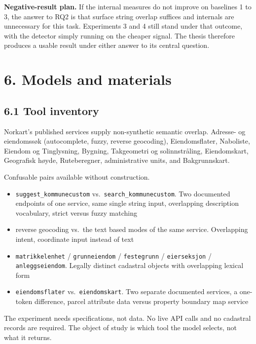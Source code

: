 \documentclass[11pt,a4paper]{article}
\begin{document}
\textbf{Negative-result plan.} If the internal measures do not improve on baselines 1 to 3, the answer
to RQ2 is that surface string overlap suffices and internals are unnecessary for this task.
Experiments 3 and 4 still stand under that outcome, with the detector simply running on the cheaper
signal. The thesis therefore produces a usable result under either answer to its central question.

\section*{6. Models and materials}

\subsection*{6.1 Tool inventory}

Norkart's published services supply non-synthetic semantic overlap. Adresse- og eiendomss{\o}k
(autocomplete, fuzzy, reverse geocoding), Eiendomsflater, Naboliste, Eiendom og Tinglysning,
Bygning, Takgeometri og solinnstr\r{a}ling, Eiendomskart, Geografisk h{\o}yde, Ruteberegner,
administrative units, and Bakgrunnskart.

Confusable pairs available without construction.

\begin{itemize}
    \item \texttt{suggest\_kommunecustom} vs.\ \texttt{search\_kommunecustom}. Two documented endpoints of one service,
    same single string input, overlapping description vocabulary, strict versus fuzzy matching
    \item reverse geocoding vs.\ the text based modes of the same service. Overlapping intent, coordinate
    input instead of text
    \item \texttt{matrikkelenhet} / \texttt{grunneiendom} / \texttt{festegrunn} / \texttt{eierseksjon} / \texttt{anleggseiendom}. Legally
    distinct cadastral objects with overlapping lexical form
    \item \texttt{eiendomsflater} vs.\ \texttt{eiendomskart}. Two separate documented services, a one-token difference,
    parcel attribute data versus property boundary map service
\end{itemize}

The experiment needs specifications, not data. No live API calls and no cadastral records are
required. The object of study is which tool the model selects, not what it returns.
\end{document}
